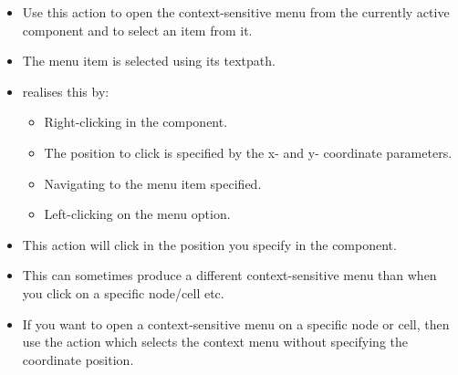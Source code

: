 
\begin{itemize}
\item Use this action to open the context-sensitive menu from the currently active component and to select an item from it.
\item The menu item is selected using its textpath. 
\item \app{} realises this by:
\begin{itemize}
\item Right-clicking in the component.
\item The position to click is specified by the x- and y- coordinate parameters.
\item Navigating to the menu item specified.
\item Left-clicking on the menu option.  
\end{itemize}
\item This action will click in the position you specify in the component.
\item This can sometimes produce a different context-sensitive menu than when you click on a specific node/cell etc.
\item If you want to open a context-sensitive menu on a specific node or cell, then use the action which selects the context menu without specifying the coordinate position.
\end{itemize}

